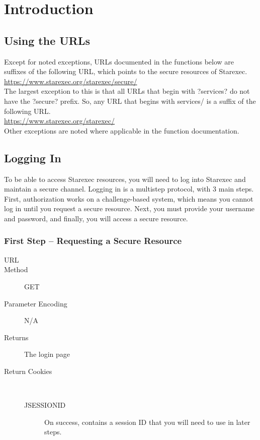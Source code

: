 \chapter{Introduction}
\section{Using the URLs}

Except for noted exceptions, URLs documented in the functions below are suffixes of the following URL, which points to the secure resources of Starexec.
\\\url{https://www.starexec.org/starexec/secure/}\\

The largest exception to this is that all URLs that begin with ?services? do not have the ?secure? prefix. So, any URL that begins with services/ is a suffix of the following URL.
\\\url{https://www.starexec.org/starexec/}\\

Other exceptions are noted where applicable in the function documentation.


\section{Logging In}

To be able to access Starexec resources, you will need to log into Starexec and maintain a secure channel. Logging in is a multistep protocol, with 3 main steps. First, authorization works on a challenge-based system, which means you cannot log in until you request a secure resource. Next, you must provide your username and password, and finally, you will access a secure resource.

\subsection{First Step -- Requesting a Secure Resource}

\begin{description}
\item [URL] 
\item [Method] GET
\item [Parameter Encoding] N/A
\item [Returns] The login page
\item [Return Cookies] \

	\begin{description}
	\item [JSESSIONID]  On success, contains a session ID that you will need to use in later steps.
	\end{description}
\end{description}

